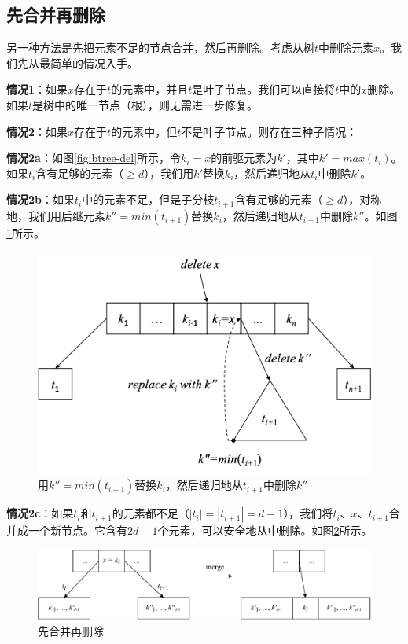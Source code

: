 \documentclass[b5paper]{ctexart}
\begin{document}
\subsection{先合并再删除}

另一种方法是先把元素不足的节点合并，然后再删除。考虑从树$t$中删除元素$x$。我们先从最简单的情况入手。

\textbf{情况1}：如果$x$存在于$t$的元素中，并且$t$是叶子节点。我们可以直接将$t$中的$x$删除。如果$t$是树中的唯一节点（根），则无需进一步修复。

\textbf{情况2}：如果$x$存在于$t$的元素中，但$t$不是叶子节点。则存在三种子情况：

\textbf{情况2a}：如图\cref{fig:btree-del}所示，令$k_i = x$的前驱元素为$k'$，其中$k' = max(t_i)$。如果$t_i$含有足够的元素（$\geq d$），我们用$k'$替换$k_i$，然后递归地从$t_i$中删除$k'$。

\textbf{情况2b}：如果$t_i$中的元素不足，但是子分枝$t_{i+1}$含有足够的元素（$\geq d$），对称地，我们用后继元素$k'' = min(t_{i+1})$替换$k_i$，然后递归地从$t_{i+1}$中删除$k''$。如图\cref{fig:btree-del-case2b}所示。

\begin{figure}[htbp]
  \centering
  \includegraphics[scale=0.5]{img/btree-del-case2b}
  \caption{用$k'' = min(t_{i+1})$替换$k_i$，然后递归地从$t_{i+1}$中删除$k''$}
  \label{fig:btree-del-case2b}
\end{figure}

\textbf{情况2c}：如果$t_i$和$t_{i+1}$的元素都不足（$|t_i| = |t_{i+1}| = d - 1$），我们将$t_i$、$x$、$t_{i+1}$合并成一个新节点。它含有$2d - 1$个元素，可以安全地从中删除。如图\cref{fig:btree-del-merge}所示。

\begin{figure}[htbp]
  \centering
  \includegraphics[scale=0.65]{img/btree-del-merge}
  \caption{先合并再删除}
  \label{fig:btree-del-merge}
\end{figure}
\end{document}
